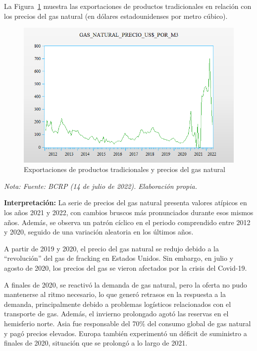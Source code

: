 \documentclass[
  a4paper,
]{article}
\begin{document}
La Figura~\ref{fig-4} muestra las exportaciones de productos
tradicionales en relación con los precios del gas natural (en dólares
estadounidenses por metro cúbico).

\begin{figure}

\caption{\label{fig-4}Exportaciones de productos tradicionales y precios
del gas natural}

{\centering \includegraphics{20230603090113.png}

}

\end{figure}

\emph{Nota: Fuente: BCRP (14 de julio de 2022). Elaboración propia.}

\textbf{Interpretación:} La serie de precios del gas natural presenta
valores atípicos en los años 2021 y 2022, con cambios bruscos más
pronunciados durante esos mismos años. Además, se observa un patrón
cíclico en el periodo comprendido entre 2012 y 2020, seguido de una
variación aleatoria en los últimos años.

A partir de 2019 y 2020, el precio del gas natural se redujo debido a la
``revolución'' del gas de fracking en Estados Unidos. Sin embargo, en
julio y agosto de 2020, los precios del gas se vieron afectados por la
crisis del Covid-19.

A finales de 2020, se reactivó la demanda de gas natural, pero la oferta
no pudo mantenerse al ritmo necesario, lo que generó retrasos en la
respuesta a la demanda, principalmente debido a problemas logísticos
relacionados con el transporte de gas. Además, el invierno prolongado
agotó las reservas en el hemisferio norte. Asia fue responsable del 70\%
del consumo global de gas natural y pagó precios elevados. Europa
también experimentó un déficit de suministro a finales de 2020,
situación que se prolongó a lo largo de 2021.
\end{document}
